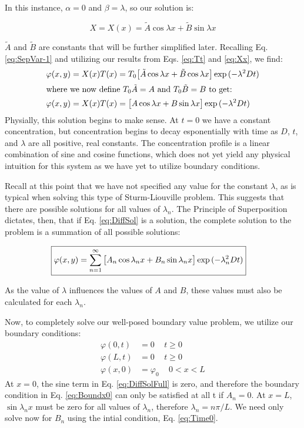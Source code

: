 In this instance, $\alpha = 0$ and $\beta = \lambda$, so our solution is:

\begin{equation}
	X = X(x) = \tilde{A} \cos{\lambda x} + \tilde{B} \sin{\lambda x} \label{eq:Xx}
\end{equation}
		
$\tilde{A}$ and $\tilde{B}$ are constants that will be further simplified later. Recalling Eq. \ref{eq:SepVar-1} and utilizing our results from Eqs. \ref{eq:Tt} and \ref{eq:Xx}, we find:
%
\begin{align}
	\varphi(x,y) &= X(x)T(x) = T_0 \big[\tilde{A} \cos{\lambda x} + \tilde{B} \cos{\lambda x}\big]\exp{(-\lambda^2 D t)}\\
	\intertext{where we now define $T_0 \tilde{A} = A$ and $T_0 \tilde{B} = B$ to get:}
	\varphi(x,y) &= X(x)T(x) = \big[A\cos{\lambda x} + B\sin{\lambda x}\big]\exp{(-\lambda^2 D t)} \label{eq:DiffSol}
\end{align}
%
Physially, this solution begins to make sense. At $t=0$ we have a constant concentration, but concentration begins to decay esponentially with time as $D$, $t$, and $\lambda$ are all positive, real constants. The concentration profile is a linear combination of sine and cosine functions, which does not yet yield any physical intuition for this system as we have yet to utilize boundary conditions. 

Recall at this point that we have not specified any value for the constant $\lambda$, as is typical when solving this type of Sturm-Liouville problem. This suggests that there are possible solutions for all values of $\lambda_n$. The Principle of Superposition dictates, then, that if Eq. \ref{eq:DiffSol} is a solution, the complete solution to the problem is a summation of all possible solutions:

\begin{align}
	\Aboxed{\varphi(x,y) = 	\sum_{n=1}^\infty \big[A_n\cos{\lambda_n x} + B_n\sin{\lambda_n x}\big]\exp{(-\lambda_n^2 D t)}} \label{eq:DiffSolFull}
\end{align}

As the value of $\lambda$ influences the values of $A$ and $B$, these values must also be calculated for each $\lambda_n$.

Now, to completely solve our well-posed boundary value problem, we utilize our boundary conditions:
%
\begin{subequations}
	\begin{align}
		\varphi(0,t) &= 0\, \quad t \geq 0 \label{eq:Boundx0}\\
		\varphi(L,t) &= 0\, \quad t \geq 0 \label{eq:BoundxL}\\
		\varphi(x,0) &= \varphi_0\, \quad 0<x<L \label{eq:Time0}
	\end{align}
\end{subequations}
%
At $x = 0$, the sine term in Eq. \ref{eq:DiffSolFull} is zero, and therefore the boundary condition in Eq. \ref{eq:Boundx0} can only be satisfied at all t if $A_n = 0$. At $x = L$, $\sin{\lambda_n x}$ must be zero for all values of $\lambda_n$, therefore $\lambda_n = n\pi/L$. We need only solve now for $B_n$ using the intial condition, Eq. \ref{eq:Time0}.

